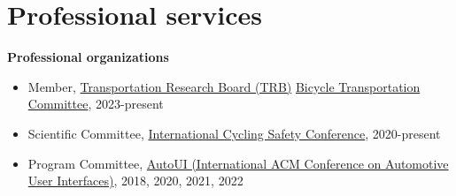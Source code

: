 \documentclass[11pt]{article}
\newenvironment{main}
{\begin{adjustwidth}{3em}{}}
{\end{adjustwidth}}
\begin{document}
\section*{Professional services}
\begin{main}

\textbf{Professional organizations}
\begin{itemize}
    \item Member, \href{https://www.trb.org/}{Transportation Research Board (TRB)} \href{https://sites.google.com/view/anf20/}{Bicycle Transportation Committee}, 2023-present
    \item Scientific Committee, \href{http://www.cyclingsafety.net}{International Cycling Safety Conference}, 2020-present
    \item Program Committee, \href{https://www.auto-ui.org/}{AutoUI (International ACM Conference on Automotive User Interfaces)}, 2018, 2020, 2021, 2022
\end{itemize}



\end{main}
\end{document}
